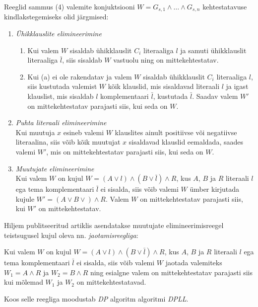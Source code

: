 Reeglid sammus (4) valemite konjuktsiooni $W=G_{s,1}\wedge\dots\wedge G_{s,n}$
kehtestatavuse kindlakstegemiseks olid järgmised:

\begin{enumerate}
  \item \emph{Ühikklauslite elimineerimine}
  	\begin{enumerate}
        \item Kui valem $W$ sisaldab ühikklauslit $C_i$ literaaliga $l$ ja
        samuti ühikklauslit literaaliga $\bar{l}$, siis sisaldab $W$ vastuolu
        ning on mittekehtestatav.
        \item Kui (a) ei ole rakendatav ja valem $W$ sisaldab ühikklauslit $C_i$
        literaaliga $l$, siis kustutada valemist $W$ kõik klauslid, mis sisaldavad literaali $l$ ja
        igast klauslist, mis sisaldab $l$ komplementaari $\bar{l}$,
        kustutada $\bar{l}$. Saadav valem $W'$ on mittekehtestatav parajasti
        siis, kui seda on $W$.
   \end{enumerate}
   \item \emph{Puhta literaali elimineerimine}\\
        Kui muutuja $x$ esineb valemi $W$ klauslites ainult
        positiivse või negatiivse literaalina, siis võib kõik muutujat $x$
        sisaldavad klauslid eemaldada, saades valemi $W'$, mis on mittekehtestatav parajasti siis,
        kui seda on $W$.
   \item \emph{Muutujate elimineerimine}\\
   		Kui valem $W$ on kujul $W=(A\vee l)\wedge(B\vee \bar{l})\wedge R$, kus $A$,
   		$B$ ja $R$ literaali $l$ ega tema komplementaari $\bar{l}$ ei sisalda,
   		siis võib valemi $W$ ümber kirjutada kujule $W'=(A\vee B\vee)\wedge R$.
   		Valem $W$ on mittekehtestatav parajasti siis, kui $W'$ on mittekehtestatav.
\end{enumerate}

Hiljem publitseeritud artiklis \cite{davis62} asendatakse
muutujate elimineerimisreegel teistsugusel kujul oleva nn.
\emph{jaotamisreegliga}:

Kui valem $W$ on kujul $W=(A\vee l)\wedge(B\vee \bar{l})\wedge R$, kus $A$,
$B$ ja $R$ literaali $l$ ega tema komplementaari $\bar{l}$ ei sisalda,
siis võib valemi $W$ jaotada valemiteks $W_1=A\wedge R$ ja $W_2=B\wedge R$ ning
esialgne valem on mittekehtestatav parajasti siis kui mõlemad $W_1$ ja $W_2$ on
mittekehtestatavad.

Koos selle reegliga moodustab \textit{DP} algoritm algoritmi \textit{DPLL}.

